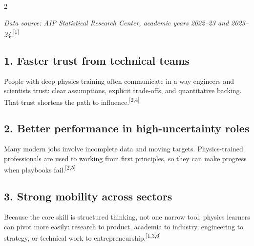 \documentclass[11pt]{article}
\newcommand{\rcite}[1]{\textsuperscript{[#1]}}
\begin{document}
\begin{multicols}{2}
\begin{center}
\end{center}

{\footnotesize\textit{Data source: AIP Statistical Research Center, academic years 2022--23 and 2023--24.}\rcite{1}}

\subsection*{1. Faster trust from technical teams}
People with deep physics training often communicate in a way engineers and scientists trust: clear assumptions, explicit trade-offs, and quantitative backing. That trust shortens the path to influence.\rcite{2,4}

\subsection*{2. Better performance in high-uncertainty roles}
Many modern jobs involve incomplete data and moving targets. Physics-trained professionals are used to working from first principles, so they can make progress when playbooks fail.\rcite{2,5}

\subsection*{3. Strong mobility across sectors}
Because the core skill is structured thinking, not one narrow tool, physics learners can pivot more easily: research to product, academia to industry, engineering to strategy, or technical work to entrepreneurship.\rcite{1,3,6}


\end{multicols}
\end{document}
